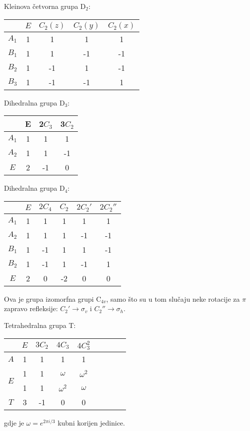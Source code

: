 Kleinova četvorna grupa D$_2$:
\begin{center}
\begin{tabular}{c|cccc}
     & $E$ & $C_{2}(z)$ & $C_{2}(y)$ & $C_{2}(x)$ \\ \hline
    $A_1$ & 1 & 1 & 1 & 1 \\
    $B_1$ & 1 & 1 & -1 & -1 \\
    $B_2$ & 1 & -1 & 1 & -1 \\
    $B_3$ & 1 & -1 & -1 & 1 \\
\end{tabular}
\end{center}

Dihedralna grupa D$_3$:
\begin{center}
\begin{tabular}{c|ccc}
  & E & 2$C_3$  & 3$C_2$ \\ \hline
$A_1$ & 1 & 1& 1 \\
$A_2$ & 1 & 1&-1 \\
 $E$  & 2 &-1& 0
\end{tabular}
\end{center}


Dihedralna grupa D$_{4}$:
\begin{center}
    \begin{tabular}{c|ccccc}
         & $E$ & $2C_4$ & $C_2$ & $2C_{2}'$ & $2C_{2}''$ \\ \hline
        $A_1$ & 1 & 1 & 1 & 1 & 1 \\
        $A_2$ & 1 & 1 & 1 & -1 & -1 \\
        $B_1$ & 1 & -1 & 1 & 1 & -1 \\
        $B_2$ & 1 & -1 & 1 & -1 & 1 \\
        $E$ & 2 & 0 & -2 & 0 & 0 \\
    \end{tabular}
\end{center}
Ova je grupa izomorfna grupi C$_{4v}$, samo što su u tom  slučaju
neke rotacije za $\pi$ zapravo refleksije: $C_{2}' \to \sigma_v$ i
$C_{2}'' \to \sigma_h$.


Tetrahedralna grupa T:
\begin{center}
\begin{tabular}{c|cccccccc}
 & $E$ & $3C_2$ & $4C_3$ & $4C_{3}^2$  \\ \hline
$A$ & 1 & 1 & 1 & 1  \\
\multirow{2}{*}{$E$} & 1 & 1 & $\omega$ & $\omega^2$ \\
 & 1 & 1 & $\omega^2$ & $\omega$  \\
$T$ & 3 & -1 & 0 & 0  \\
\end{tabular}
\end{center}
gdje je $\omega = e^{2\pi i/3}$ kubni korijen jedinice.


